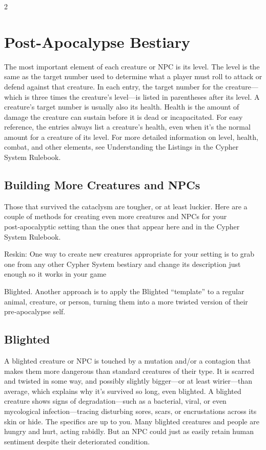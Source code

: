 \begin{multicols}{2}

\chapter{Post-Apocalypse Bestiary}

The most important element of each creature or NPC is its level. The level is the same as the target number used to determine what a player must roll to attack or defend against that creature. In each entry, the target number for the creature—which is three times the creature’s level—is listed in parentheses after its level. A creature’s target number is usually also its health. Health is the amount of damage the creature can sustain before it is dead or incapacitated. For easy reference, the entries always list a creature’s health, even when it’s the normal amount for a creature of its level. For more detailed information on level, health, combat, and other elements, see Understanding the Listings in the Cypher System Rulebook.

\section{Building More Creatures and NPCs}

Those that survived the cataclysm are tougher, or at least luckier. Here are a couple of methods for creating even more creatures and NPCs for your post‑apocalyptic setting than the ones that appear here and in the Cypher System Rulebook. 

Reskin: One way to create new creatures appropriate for your setting is to grab one from any other Cypher System bestiary and change its description just enough so
it works in your game

Blighted. Another approach is to apply the Blighted “template” to a regular animal, creature, or person, turning them into a more twisted version of their pre‑apocalypse self.

\section{Blighted}

A blighted creature or NPC is touched by a mutation and/or a contagion that makes them more dangerous than standard creatures of their type. It is scarred and twisted in some way, and possibly slightly bigger—or at least wirier—than average, which explains why it’s survived so long, even blighted. A blighted creature shows signs of degradation—such as a bacterial, viral, or even mycological infection—tracing disturbing sores, scars, or encrustations across its skin or hide. The specifics are up to you. Many blighted creatures and people are hungry and hurt, acting rabidly. But an NPC could just as easily retain human sentiment despite their deteriorated condition.


\end{multicols}

